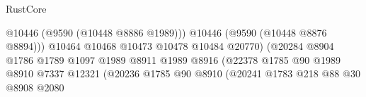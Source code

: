 \begin{lexlean}{RustCore}
\begin{coremodule}
                                                                  @10446
                                                                  (@9590 (@10448 @8886 @1989)))
                                                                @10446
                                                                (@9590 (@10448 @8876 @8894)))
                                                              @10464
                                                              @10468
                                                              @10473
                                                              @10478
                                                              @10484
                                                              @20770)
                                                            (@20284
                                                              @8904
                                                              @1786
                                                              @1789
                                                              @1097
                                                              @1989
                                                              @8911
                                                              @1989
                                                              @8916
                                                              (@22378
                                                                @1785
                                                                @90
                                                                @1989
                                                                @8910
                                                                @7337
                                                                @12321
                                                                (@20236
                                                                  @1785
                                                                  @90
                                                                  @8910
                                                                  (@20241
                                                                    @1783
                                                                    @218
                                                                    @88
                                                                    @30
                                                                    @8908
                                                                    @2080

\end{coremodule}
\end{lexlean}
